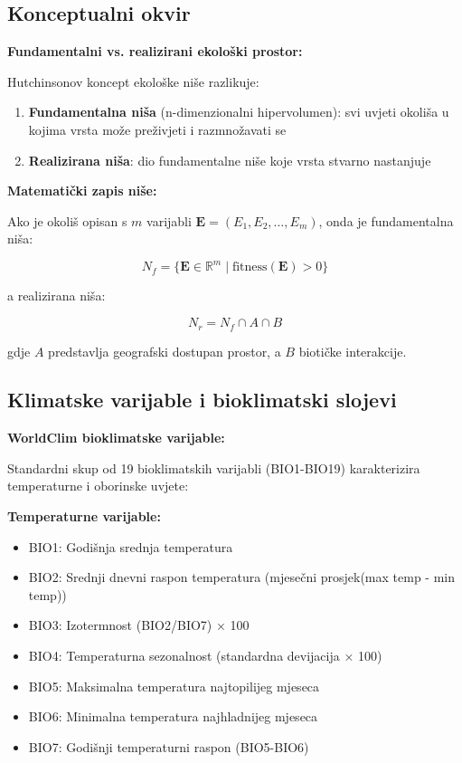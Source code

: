 \documentclass[11pt,oneside]{book}
\begin{document}
\subsection{Konceptualni okvir}

\textbf{Fundamentalni vs. realizirani ekološki prostor:}

Hutchinsonov koncept ekološke niše razlikuje:

\begin{enumerate}
	\item \textbf{Fundamentalna niša} (n-dimenzionalni hipervolumen): svi uvjeti okoliša u kojima vrsta može preživjeti i razmnožavati se
	\item \textbf{Realizirana niša}: dio fundamentalne niše koje vrsta stvarno nastanjuje
\end{enumerate}

\textbf{Matematički zapis niše:}

Ako je okoliš opisan s $m$ varijabli $\mathbf{E} = (E_1, E_2, \ldots, E_m)$, onda je fundamentalna niša:

\begin{equation}
	N_f = \{\mathbf{E} \in \mathbb{R}^m \mid \text{fitness}(\mathbf{E}) > 0\}
\end{equation}

a realizirana niša:

\begin{equation}
	N_r = N_f \cap A \cap B
\end{equation}

gdje $A$ predstavlja geografski dostupan prostor, a $B$ biotičke interakcije.

\subsection{Klimatske varijable i bioklimatski slojevi}

\textbf{WorldClim bioklimatske varijable:}

Standardni skup od 19 bioklimatskih varijabli (BIO1-BIO19) karakterizira temperaturne i oborinske uvjete:

\textbf{Temperaturne varijable:}
\begin{itemize}
	\item BIO1: Godišnja srednja temperatura
	\item BIO2: Srednji dnevni raspon temperatura (mjesečni prosjek(max temp - min temp))
	\item BIO3: Izotermnost (BIO2/BIO7) × 100
	\item BIO4: Temperaturna sezonalnost (standardna devijacija × 100)
	\item BIO5: Maksimalna temperatura najtopilijeg mjeseca
	\item BIO6: Minimalna temperatura najhladnijeg mjeseca
	\item BIO7: Godišnji temperaturni raspon (BIO5-BIO6)
\end{itemize}
\end{document}
